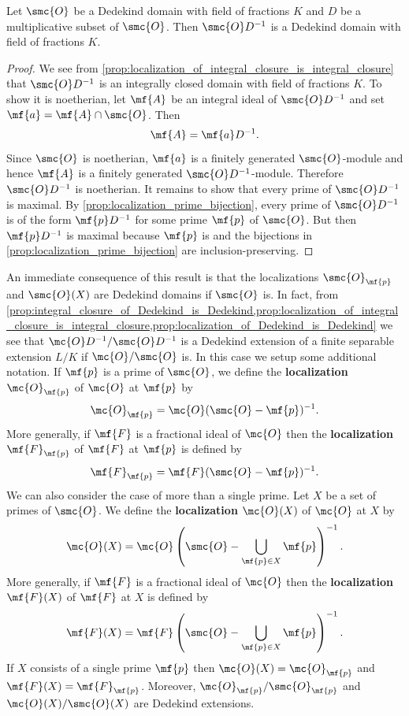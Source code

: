 \documentclass[12pt]{article}
\begin{document}
      \begin{proposition}\label{prop:localization_of_Dedekind_is_Dedekind}
        Let \(\smc{O}\) be a Dedekind domain with field of fractions \(K\) and \(D\) be a multiplicative subset of \(\smc{O}\). Then \(\smc{O}D^{-1}\) is a Dedekind domain with field of fractions \(K\).
      \end{proposition}
      \begin{proof}
        We see from \cref{prop:localization_of_integral_closure_is_integral_closure} that \(\smc{O}D^{-1}\) is an integrally closed domain with field of fractions \(K\). To show it is noetherian, let \(\mf{A}\) be an integral ideal of \(\smc{O}D^{-1}\) and set \(\mf{a} = \mf{A} \cap \smc{O}\). Then
        \[
          \mf{A} = \mf{a}D^{-1}.
        \]
        Since \(\smc{O}\) is noetherian, \(\mf{a}\) is a finitely generated \(\smc{O}\)-module and hence \(\mf{A}\) is a finitely generated \(\smc{O}D^{-1}\)-module. Therefore \(\smc{O}D^{-1}\) is noetherian. It remains to show that every prime of \(\smc{O}D^{-1}\) is maximal. By \cref{prop:localization_prime_bijection}, every prime of \(\smc{O}D^{-1}\) is of the form \(\mf{p}D^{-1}\) for some prime \(\mf{p}\) of \(\smc{O}\). But then \(\mf{p}D^{-1}\) is maximal because \(\mf{p}\) is and the bijections in \cref{prop:localization_prime_bijection} are inclusion-preserving.
      \end{proof}

      An immediate consequence of this result is that the localizations \(\smc{O}_{\mf{p}}\) and \(\smc{O}(X)\) are Dedekind domains if \(\smc{O}\) is. In fact, from \cref{prop:integral_closure_of_Dedekind_is_Dedekind,prop:localization_of_integral_closure_is_integral_closure,prop:localization_of_Dedekind_is_Dedekind} we see that \(\mc{O}D^{-1}/\smc{O}D^{-1}\) is a Dedekind extension of a finite separable extension \(L/K\) if \(\mc{O}/\smc{O}\) is. In this case we setup some additional notation. If \(\mf{p}\) is a prime of \(\smc{O}\), we define the \textbf{localization} \(\mc{O}_{\mf{p}}\) of \(\mc{O}\) at \(\mf{p}\) by
      \[
        \mc{O}_{\mf{p}} = \mc{O}(\smc{O}-\mf{p})^{-1}.
      \]
      More generally, if \(\mf{F}\) is a fractional ideal of \(\mc{O}\) then the \textbf{localization} \(\mf{F}_{\mf{p}}\) of \(\mf{F}\) at \(\mf{p}\) is defined by
      \[
        \mf{F}_{\mf{p}} = \mf{F}(\smc{O}-\mf{p})^{-1}.
      \]
      We can also consider the case of more than a single prime. Let \(X\) be a set of primes of \(\smc{O}\). We define the \textbf{localization} \(\mc{O}(X)\) of \(\mc{O}\) at \(X\) by
      \[
        \mc{O}(X) = \mc{O}\left(\smc{O}-\bigcup_{\mf{p} \in X}\mf{p}\right)^{-1}.
      \]
      More generally, if \(\mf{F}\) is a fractional ideal of \(\mc{O}\) then the \textbf{localization} \(\mf{F}(X)\) of \(\mf{F}\) at \(X\) is defined by
      \[
        \mf{F}(X) = \mf{F}\left(\smc{O}-\bigcup_{\mf{p} \in X}\mf{p}\right)^{-1}.
      \]
      If \(X\) consists of a single prime \(\mf{p}\) then \(\mc{O}(X) = \mc{O}_{\mf{p}}\) and \(\mf{F}(X) = \mf{F}_{\mf{p}}\). Moreover, \(\mc{O}_{\mf{p}}/\smc{O}_{\mf{p}}\) and \(\mc{O}(X)/\smc{O}(X)\) are Dedekind extensions.
      
\end{document}
